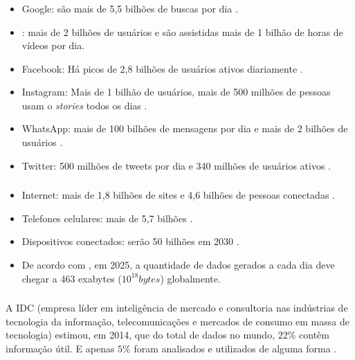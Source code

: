 \documentclass[12pt]{beamer}
\begin{document}
\begin{frame}{}
\frametitle{}
\begin{block}{}
\justifying
\begin{itemize}
\item Google: são mais de 5,5 bilhões de buscas por dia \cite{ardorseo}.\pause
\item \citet{youtube}: mais de 2 bilhões de usuários e são assistidas mais de 1 bilhão de horas de vídeos por dia.\pause
\item Facebook: Há picos de 2,8 bilhões de usuários ativos diariamente \cite{internetstats}.\pause
\item Instagram: Mais de 1 bilhão de usuários, mais de 500 milhões de pessoas usam o \textit{stories} todos os dias \cite{InstagramStats}.\pause
\item WhatsApp: mais de 100 bilhões de mensagens por dia e mais de 2 bilhões de usuários \cite{WhatsappStats}.\pause
\item Twitter: 500 milhões de tweets por dia e 340 milhões de usuários ativos \cite{TwitterStats}.
\end{itemize}
\end{block}
\end{frame}

\begin{frame}{}
\frametitle{}
\begin{block}{}
\justifying
\begin{itemize}
\item Internet: mais de 1,8 bilhões de sites \cite{internetstats2} e 4,6 bilhões de pessoas conectadas \cite{statista}.\pause
\item Telefones celulares: mais de 5,7 bilhões \cite{datareportal}.\pause
\item Dispositivos conectados: serão 50 bilhões em 2030 \cite{statista}.\pause
\item De acordo com \citet{seedscientific}, em 2025, a quantidade de dados gerados a cada dia deve chegar a 463 exabytes ($10^{18} bytes$) globalmente.
\end{itemize}
\end{block}
\end{frame}

\begin{frame}{}
\frametitle{}
\begin{block}{}
\justifying
A IDC (empresa líder em inteligência de mercado e consultoria nas indústrias de tecnologia da informação, telecomunicações e mercados de consumo em massa de tecnologia) estimou, em 2014, que do total de dados no mundo, $22\%$ contêm informação útil. E apenas $5\%$ foram analisados e utilizados de alguma forma \cite{exame14}.
\end{block}
\end{frame}
\end{document}

